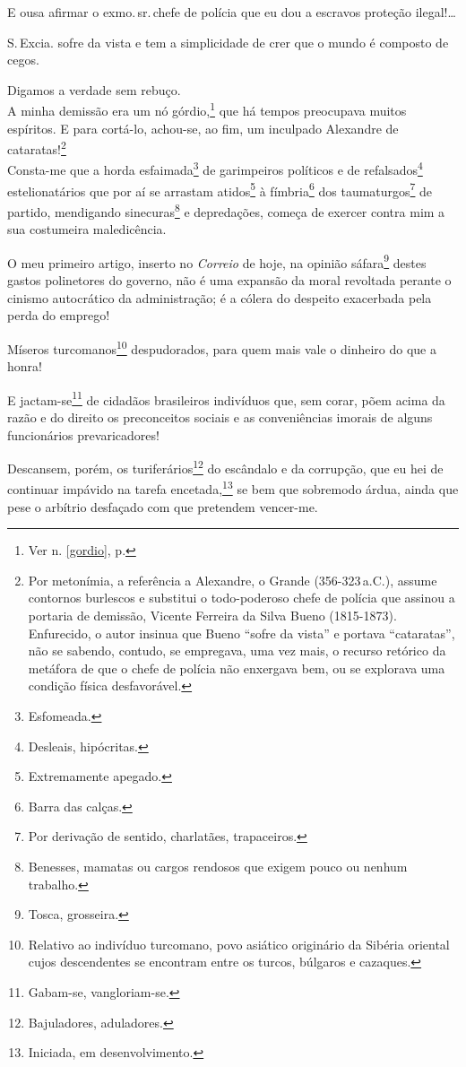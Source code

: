 E ousa afirmar o exmo.\,sr.\,chefe de polícia que eu dou a escravos
proteção ilegal!\ldots{}

S.\,Excia. sofre da vista e tem a simplicidade de crer que o mundo é
composto de cegos.

Digamos a verdade sem rebuço.\\
A minha demissão era um nó górdio,\footnote{Ver n. \ref{gordio}, p. \pageref{gordio}} 
que há tempos preocupava muitos espíritos. E para cortá-lo, achou-se, ao fim, 
um inculpado Alexandre de cataratas!\footnote{Por metonímia, a referência 
a Alexandre, o Grande (356-323\,a.C.), assume contornos burlescos e substitui 
o todo-poderoso chefe de polícia que assinou a portaria de demissão, Vicente 
Ferreira da Silva Bueno (1815-1873). Enfurecido, o autor insinua que Bueno
  ``sofre da vista'' e portava ``cataratas'', não se sabendo, contudo, se
  empregava, uma vez mais, o recurso retórico da metáfora de que o chefe
  de polícia não enxergava bem, ou se explorava uma condição física
  desfavorável.}\\
Consta-me que a horda esfaimada\footnote{Esfomeada.} de garimpeiros
políticos e de refalsados\footnote{Desleais, hipócritas.}
estelionatários que por aí se arrastam atidos\footnote{Extremamente
  apegado.} à fímbria\footnote{Barra das calças.} dos
taumaturgos\footnote{Por derivação de sentido, charlatães,
  trapaceiros.} de partido, mendigando sinecuras\footnote{Benesses,
  mamatas ou cargos rendosos que exigem pouco ou nenhum trabalho.} e
depredações, começa de exercer contra mim a sua costumeira maledicência.

O meu primeiro artigo, inserto no \emph{Correio} de hoje, na opinião
sáfara\footnote{Tosca, grosseira.} destes gastos polinetores do
governo, não é uma expansão da moral revoltada perante o cinismo
autocrático da administração; é a cólera do despeito exacerbada pela
perda do emprego!

Míseros turcomanos\footnote{Relativo ao indivíduo turcomano, povo
  asiático originário da Sibéria oriental cujos descendentes se
  encontram entre os turcos, búlgaros e cazaques.} despudorados, para
quem mais vale o dinheiro do que a honra!

E jactam-se\footnote{Gabam-se, vangloriam-se.} de cidadãos brasileiros
indivíduos que, sem corar, põem acima da razão e do direito os
preconceitos sociais e as conveniências imorais de alguns funcionários
prevaricadores!

Descansem, porém, os turiferários\footnote{Bajuladores, aduladores.}
do escândalo e da corrupção, que eu hei de continuar impávido na tarefa
encetada,\footnote{Iniciada, em desenvolvimento.} se bem que sobremodo
árdua, ainda que pese o arbítrio desfaçado com que pretendem vencer-me.

